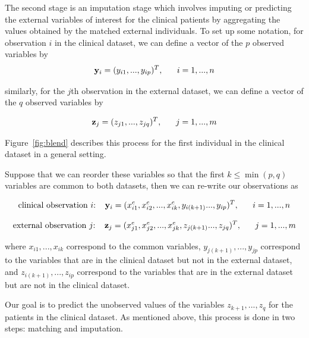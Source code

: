 \documentclass{article}
\begin{document}
The second stage is an imputation stage which involves imputing or predicting the external variables of interest for the clinical patients by aggregating the values obtained by the matched external individuals. To set up some notation, for observation $i$ in the clinical dataset, we can define a vector of the $p$ observed variables by
$${\bf y}_i = (y_{i1}, ..., y_{ip})^T, ~~~~~ i = 1, ..., n$$

similarly, for the $j$th observation in the external dataset, we can define a vector of the $q$ observed variables by

$${\bf z}_j = (z_{j1}, ..., z_{jq})^T, ~~~~~ j = 1, ..., m$$

Figure~\ref{fig:blend} describes this process for the first individual in the clinical dataset in a general setting.

Suppose that we can reorder these variables so that the first $k \leq \min(p,q)$ variables are common to both datasets, then we can re-write our observations as

$$\text{clinical observation $i$: } ~~{\bf y}_i = (x^c_{i1}, x^c_{i2}, ..., x^c_{ik}, y_{i(k+1)} ..., y_{ip})^T, ~~~~~ i = 1, ..., n$$



$$\text{external observation $j$: }~~{\bf z}_j = (x^e_{j1}, x^e_{j2}, ..., x^e_{jk}, z_{j(k+1)} ..., z_{jq})^T, ~~~~~ j = 1, ..., m$$


where $x_{i1}, ..., x_{ik}$ correspond to the common variables, $y_{j(k+1)}, ..., y_{jp}$ correspond to the variables that are in the clinical dataset but not in the external dataset, and $z_{i(k+1)}, ..., z_{ip}$ correspond to the variables that are in the external dataset but are not in the clinical dataset.

Our goal is to predict the unobserved values of the variables $z_{k+1}, ..., z_q$ for the patients in the clinical dataset. As mentioned above, this process is done in two steps: matching and imputation.
\end{document}
